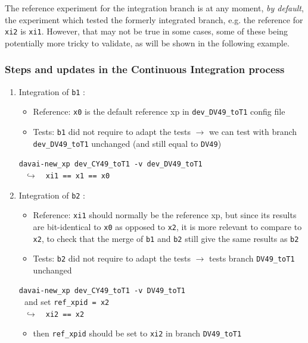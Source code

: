 \documentclass[a4paper,10pt,twoside]{article}
\begin{document}
\begin{appendix}
The reference experiment for the integration branch is at any moment, \textit{by default}, the experiment which tested the formerly integrated branch, e.g. the reference for \texttt{xi2} is \texttt{xi1}. However, that may not be true in some cases, some of these being potentially more tricky to validate, as will be shown in the following example.

\subsubsection{Steps and updates in the Continuous Integration process}
\begin{enumerate}[label=(\arabic*)]
 \item Integration of \texttt{b1} :
 \begin{itemize}
  \item Reference: \texttt{x0} is the default reference xp in \texttt{dev\_DV49\_toT1} config file
  \item Tests: \texttt{b1} did not require to adapt the tests $\rightarrow$ we can test with branch \texttt{dev\_DV49\_toT1} unchanged (and still equal to \texttt{DV49})
 \end{itemize}
 \texttt{davai-new\_xp dev\_CY49\_toT1 -v dev\_DV49\_toT1}\\
 $~~~\hookrightarrow~~~$ \texttt{xi1 == x1 == x0}

 \item Integration of \texttt{b2} :
 \begin{itemize}
  \item Reference: \texttt{xi1} should normally be the reference xp, but since its results are bit-identical to \texttt{x0} as opposed to \texttt{x2}, it is more relevant to compare to \texttt{x2}, to check that the merge of \texttt{b1} and \texttt{b2} still give the same results as \texttt{b2}
  \item Tests: \texttt{b2} did not require to adapt the tests $\rightarrow$ tests branch \texttt{DV49\_toT1} unchanged
 \end{itemize}
 \texttt{davai-new\_xp dev\_CY49\_toT1 -v DV49\_toT1}\\
 $~~~$and set \texttt{ref\_xpid = x2}\\
 $~~~\hookrightarrow~~~$ \texttt{xi2 == x2}
 \begin{itemize}
  \item then \texttt{ref\_xpid} should be set to \texttt{xi2} in branch \texttt{DV49\_toT1}
 \end{itemize}


\end{enumerate}
\end{appendix}
\end{document}
